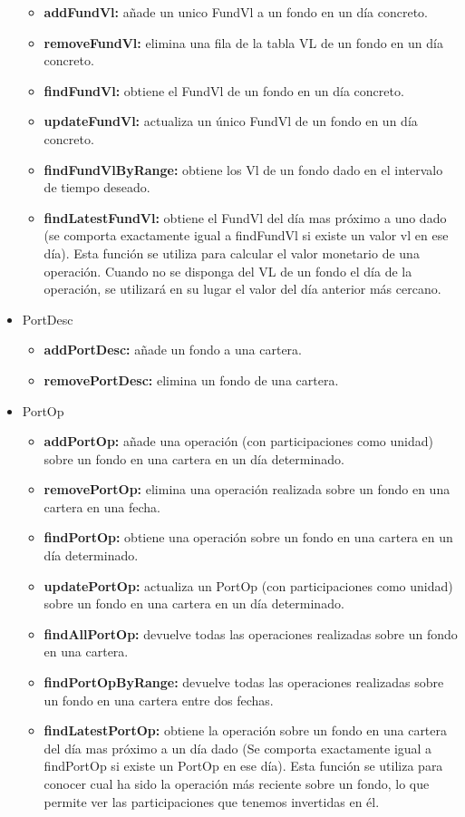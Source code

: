 \documentclass[12pt, a4paper]{book}
\begin{document}
\begin{itemize}
\begin{itemize}
							\item\textbf{addFundVl:} añade un unico FundVl a un fondo en un día concreto.
							\item\textbf{removeFundVl:} elimina una fila de la tabla \gls{VL} de un fondo en un día concreto.
							\item \textbf{findFundVl:} obtiene el FundVl de un fondo en un día concreto.
							\item \textbf{updateFundVl:} actualiza un único FundVl de un fondo en un día concreto.
							\item \textbf{findFundVlByRange:} obtiene los Vl de un fondo dado en el intervalo de tiempo deseado.
							\item \textbf{findLatestFundVl:} obtiene el FundVl del día mas próximo a uno dado (se comporta exactamente igual a findFundVl si existe un valor vl en ese día). Esta función se utiliza para calcular el valor monetario de una operación. Cuando no se disponga del \gls{VL} de un fondo el día de la operación, se utilizará en su lugar el valor del día anterior más cercano.
						\end{itemize}
				
	\item PortDesc
						\begin{itemize}
							\item\textbf{addPortDesc:} añade un fondo a una cartera.
							\item\textbf{removePortDesc:} elimina un fondo de una cartera.
						\end{itemize}
	\item PortOp
						\begin{itemize}
							\item\textbf{addPortOp:} añade una operación (con participaciones como unidad) sobre un fondo en una cartera en un día determinado.
							\item\textbf{removePortOp:} elimina una operación realizada sobre un fondo en una cartera en una fecha.
							\item \textbf{findPortOp:} obtiene una operación sobre un fondo en una cartera en un día determinado.
							\item \textbf{updatePortOp:} actualiza un PortOp (con participaciones como unidad) sobre un fondo en una cartera en un día determinado.
							\item \textbf{findAllPortOp:} devuelve todas las operaciones realizadas sobre un fondo en una cartera.
							\item \textbf{findPortOpByRange:} devuelve todas las operaciones realizadas sobre un fondo en una cartera entre dos fechas.
							\item \textbf{findLatestPortOp:} obtiene la operación sobre un fondo en una cartera del día mas próximo a un día dado (Se comporta exactamente igual a findPortOp si existe un PortOp en ese día). Esta función se utiliza para conocer cual ha sido la operación más reciente sobre un fondo, lo que permite ver las participaciones que tenemos invertidas en él.\\
						\end{itemize}
	
\end{itemize}
\end{document}

